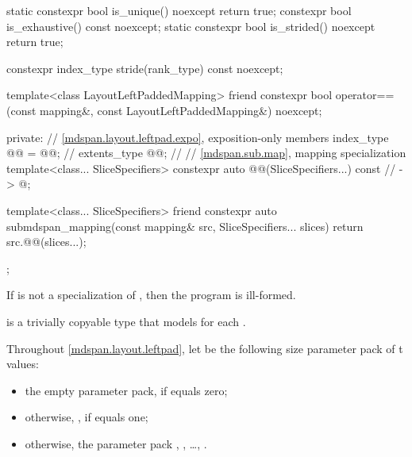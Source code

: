 \begin{codeblock}
{{    static constexpr bool is_unique() noexcept { return true; }
    constexpr bool is_exhaustive() const noexcept;
    static constexpr bool is_strided() noexcept { return true; }

    constexpr index_type stride(rank_type) const noexcept;

    template<class LayoutLeftPaddedMapping>
      friend constexpr bool operator==(const mapping&, const LayoutLeftPaddedMapping&) noexcept;

  private:
    // \ref{mdspan.layout.leftpad.expo}, exposition-only members
    index_type @@ = @@;                           // \expos
    extents_type @@{};                                               // \expos
    // \ref{mdspan.sub.map},  mapping specialization
    template<class... SliceSpecifiers>
      constexpr auto @@(SliceSpecifiers...) const     // \expos
        -> @\seebelow@;

    template<class... SliceSpecifiers>
      friend constexpr auto submdspan_mapping(const mapping& src, SliceSpecifiers... slices) {
      return src.@@(slices...);
    }
  };
}
\end{codeblock}

\pnum
If  is not a specialization of ,
then the program is ill-formed.

\pnum
{} is a trivially copyable type
that models  for each .

\pnum
Throughout \ref{mdspan.layout.leftpad},
let  be the following
size  parameter pack of t values:
\begin{itemize}
\item
the empty parameter pack, if  equals zero;
\item
\tcode otherwise, , if  equals one;
\item
otherwise, the parameter pack , , \ldots, .
\end{itemize}

